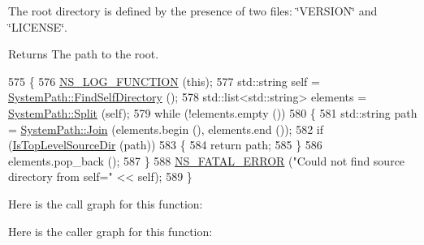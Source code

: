 The root directory is defined by the presence of two files\+: \char`\"{}\+V\+E\+R\+S\+I\+O\+N\char`\"{} and \char`\"{}\+L\+I\+C\+E\+N\+S\+E\char`\"{}.

\begin{DoxyReturn}{Returns}
The path to the root. 
\end{DoxyReturn}

\begin{DoxyCode}
575 \{
576   \hyperlink{log-macros-disabled_8h_a90b90d5bad1f39cb1b64923ea94c0761}{NS\_LOG\_FUNCTION} (\textcolor{keyword}{this});
577   std::string \textcolor{keyword}{self} = \hyperlink{group__systempath_gad52e6f153465b40487da3a2a9ee5f5d6}{SystemPath::FindSelfDirectory} ();
578   std::list<std::string> elements = \hyperlink{group__systempath_ga523072e05da63b63113d1bea840edf1a}{SystemPath::Split} (\textcolor{keyword}{self});
579   \textcolor{keywordflow}{while} (!elements.empty ())
580     \{
581       std::string path = \hyperlink{group__systempath_gab3212957e6b4f873ece3c6b8ed746d72}{SystemPath::Join} (elements.begin (), elements.end ());
582       \textcolor{keywordflow}{if} (\hyperlink{classns3_1_1TestRunnerImpl_a9cea57ad4c56ee0f2100f137d7ebd911}{IsTopLevelSourceDir} (path))
583         \{
584           \textcolor{keywordflow}{return} path;
585         \}
586       elements.pop\_back ();
587     \}
588   \hyperlink{group__fatal_ga5131d5e3f75d7d4cbfd706ac456fdc85}{NS\_FATAL\_ERROR} (\textcolor{stringliteral}{"Could not find source directory from self="} << \textcolor{keyword}{self});
589 \}
\end{DoxyCode}


Here is the call graph for this function\+:




Here is the caller graph for this function\+:


